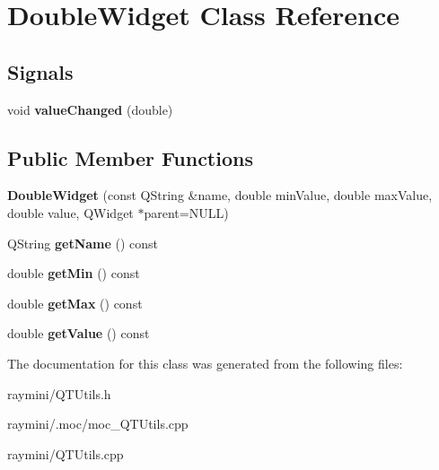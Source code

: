 \hypertarget{class_double_widget}{
\section{DoubleWidget Class Reference}
\label{class_double_widget}
}
\subsection*{Signals}
\begin{DoxyCompactItemize}
\item 
\hypertarget{class_double_widget_aff16cdb56a80413f6fed11fb4e8688e7}{
void {\bfseries valueChanged} (double)}
\label{class_double_widget_aff16cdb56a80413f6fed11fb4e8688e7}

\end{DoxyCompactItemize}
\subsection*{Public Member Functions}
\begin{DoxyCompactItemize}
\item 
\hypertarget{class_double_widget_a1a62088ea4e9de8f80e00e63c3ef0c7c}{
{\bfseries DoubleWidget} (const QString \&name, double minValue, double maxValue, double value, QWidget $\ast$parent=NULL)}
\label{class_double_widget_a1a62088ea4e9de8f80e00e63c3ef0c7c}

\item 
\hypertarget{class_double_widget_a10778974b446ccf03964b34bdc34781f}{
QString {\bfseries getName} () const }
\label{class_double_widget_a10778974b446ccf03964b34bdc34781f}

\item 
\hypertarget{class_double_widget_a5477a5af309fe31e81504cf635f49a79}{
double {\bfseries getMin} () const }
\label{class_double_widget_a5477a5af309fe31e81504cf635f49a79}

\item 
\hypertarget{class_double_widget_a31103ed9eea2412c6ed80e25b14df146}{
double {\bfseries getMax} () const }
\label{class_double_widget_a31103ed9eea2412c6ed80e25b14df146}

\item 
\hypertarget{class_double_widget_ab008347d48f2da125000f71729519fd7}{
double {\bfseries getValue} () const }
\label{class_double_widget_ab008347d48f2da125000f71729519fd7}

\end{DoxyCompactItemize}


The documentation for this class was generated from the following files:\begin{DoxyCompactItemize}
\item 
raymini/QTUtils.h\item 
raymini/.moc/moc\_\-QTUtils.cpp\item 
raymini/QTUtils.cpp\end{DoxyCompactItemize}
